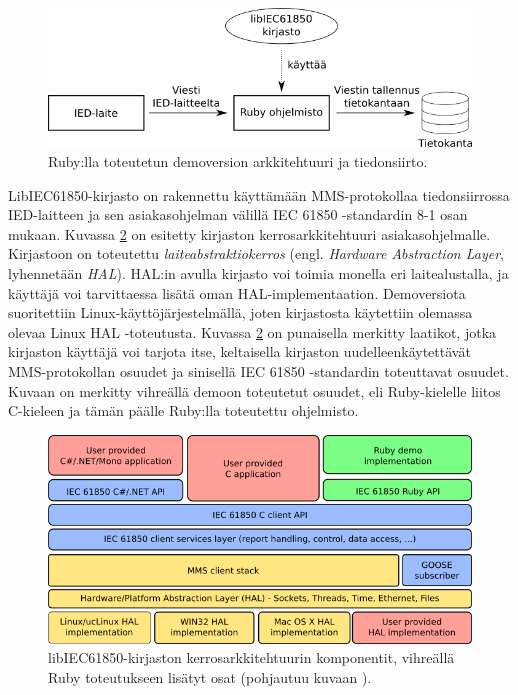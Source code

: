 \begin{figure}[ht!]
	\includegraphics[width=1\textwidth]{pictures/demo-architecture.png}
	\caption{Ruby:lla toteutetun demoversion arkkitehtuuri ja tiedonsiirto.}
	\label{fig:demo-architecture}
\end{figure}

LibIEC61850-kirjasto on rakennettu käyttämään MMS-protokollaa tiedonsiirrossa IED-laitteen ja sen asiakasohjelman välillä IEC 61850 -standardin 8-1 osan mukaan. Kuvassa \ref{fig:libiec61850-layer-architecture} on esitetty kirjaston kerrosarkkitehtuuri asiakasohjelmalle. Kirjastoon on toteutettu \emph{laiteabstraktiokerros} (engl. \emph{Hardware Abstraction Layer}, lyhennetään \emph{HAL}). HAL:in avulla kirjasto voi toimia monella eri laitealustalla, ja käyttäjä voi tarvittaessa lisätä oman HAL-implementaation. Demoversiota suoritettiin Linux-käyttöjärjestelmällä, joten kirjastosta käytettiin olemassa olevaa Linux HAL -toteutusta. Kuvassa \ref{fig:libiec61850-layer-architecture} on punaisella merkitty laatikot, jotka kirjaston käyttäjä voi tarjota itse, keltaisella kirjaston uudelleenkäytettävät MMS-protokollan osuudet ja sinisellä IEC 61850 -standardin toteuttavat osuudet. Kuvaan on merkitty vihreällä demoon toteutetut osuudet, eli Ruby-kielelle liitos C-kieleen ja tämän päälle Ruby:lla toteutettu ohjelmisto.

\begin{figure}[ht!]
	\includegraphics[width=1\textwidth]{pictures/libiec61850-layer-architecture.png}
	\caption{libIEC61850-kirjaston kerrosarkkitehtuurin komponentit, vihreällä Ruby toteutukseen lisätyt osat (pohjautuu kuvaan \mbox{\cite{libIEC61850-api-overview}}).}
	\label{fig:libiec61850-layer-architecture}
\end{figure}

